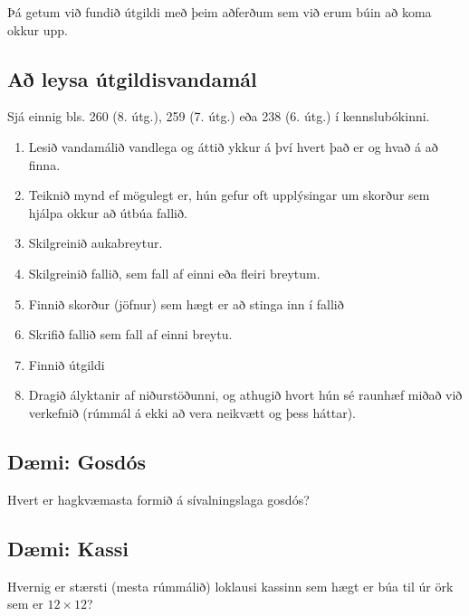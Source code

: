 \documentclass[b5paper,10pt,icelandic]{sphinxmanual}
\begin{document}
Þá getum við fundið útgildi með þeim aðferðum sem við erum búin að koma
okkur upp.


\subsection{Að leysa útgildisvandamál}
\label{\detokenize{kafli05:a-leysa-utgildisvandamal}}
Sjá einnig bls. 260 (8. útg.), 259 (7. útg.) eða 238 (6. útg.) í kennslubókinni.
\begin{enumerate}
\item {} 
Lesið vandamálið vandlega og áttið ykkur á því hvert það er og
hvað á að finna.

\item {} 
Teiknið mynd ef mögulegt er, hún gefur oft upplýsingar um skorður
sem hjálpa okkur að útbúa fallið.

\item {} 
Skilgreinið aukabreytur.

\item {} 
Skilgreinið fallið, sem fall af einni eða fleiri breytum.

\item {} 
Finnið skorður (jöfnur) sem hægt er að stinga inn í fallið

\item {} 
Skrifið fallið sem fall af einni breytu.

\item {} 
Finnið útgildi

\item {} 
Dragið ályktanir af niðurstöðunni, og athugið hvort hún sé
raunhæf miðað við verkefnið (rúmmál á ekki að vera neikvætt og
þess háttar).

\end{enumerate}


\subsection{Dæmi: Gosdós}
\label{\detokenize{kafli05:daemi-gosdos}}
Hvert er hagkvæmasta formið á sívalningslaga gosdós?



\subsection{Dæmi: Kassi}
\label{\detokenize{kafli05:daemi-kassi}}
Hvernig er stærsti (mesta rúmmálið) loklausi kassinn sem hægt er búa til úr
örk sem er \(12 \times 12\)?
\end{document}
